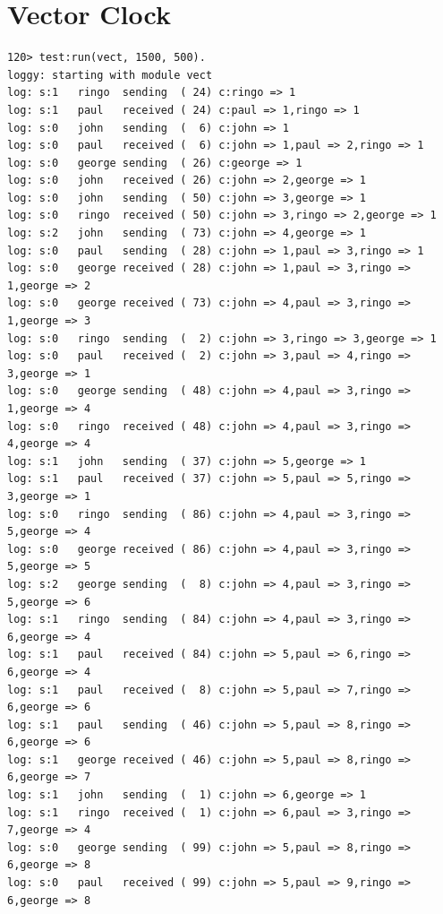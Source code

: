 \documentclass[a4paper, 11pt]{article}
\begin{document}
\section{Vector Clock}
\begin{verbatim}
120> test:run(vect, 1500, 500).
loggy: starting with module vect
log: s:1   ringo  sending  ( 24) c:ringo => 1
log: s:1   paul   received ( 24) c:paul => 1,ringo => 1
log: s:0   john   sending  (  6) c:john => 1
log: s:0   paul   received (  6) c:john => 1,paul => 2,ringo => 1
log: s:0   george sending  ( 26) c:george => 1
log: s:0   john   received ( 26) c:john => 2,george => 1
log: s:0   john   sending  ( 50) c:john => 3,george => 1
log: s:0   ringo  received ( 50) c:john => 3,ringo => 2,george => 1
log: s:2   john   sending  ( 73) c:john => 4,george => 1
log: s:0   paul   sending  ( 28) c:john => 1,paul => 3,ringo => 1
log: s:0   george received ( 28) c:john => 1,paul => 3,ringo => 1,george => 2
log: s:0   george received ( 73) c:john => 4,paul => 3,ringo => 1,george => 3
log: s:0   ringo  sending  (  2) c:john => 3,ringo => 3,george => 1
log: s:0   paul   received (  2) c:john => 3,paul => 4,ringo => 3,george => 1
log: s:0   george sending  ( 48) c:john => 4,paul => 3,ringo => 1,george => 4
log: s:0   ringo  received ( 48) c:john => 4,paul => 3,ringo => 4,george => 4
log: s:1   john   sending  ( 37) c:john => 5,george => 1
log: s:1   paul   received ( 37) c:john => 5,paul => 5,ringo => 3,george => 1
log: s:0   ringo  sending  ( 86) c:john => 4,paul => 3,ringo => 5,george => 4
log: s:0   george received ( 86) c:john => 4,paul => 3,ringo => 5,george => 5
log: s:2   george sending  (  8) c:john => 4,paul => 3,ringo => 5,george => 6
log: s:1   ringo  sending  ( 84) c:john => 4,paul => 3,ringo => 6,george => 4
log: s:1   paul   received ( 84) c:john => 5,paul => 6,ringo => 6,george => 4
log: s:1   paul   received (  8) c:john => 5,paul => 7,ringo => 6,george => 6
log: s:1   paul   sending  ( 46) c:john => 5,paul => 8,ringo => 6,george => 6
log: s:1   george received ( 46) c:john => 5,paul => 8,ringo => 6,george => 7
log: s:1   john   sending  (  1) c:john => 6,george => 1
log: s:1   ringo  received (  1) c:john => 6,paul => 3,ringo => 7,george => 4
log: s:0   george sending  ( 99) c:john => 5,paul => 8,ringo => 6,george => 8
log: s:0   paul   received ( 99) c:john => 5,paul => 9,ringo => 6,george => 8
\end{verbatim}
\end{document}
